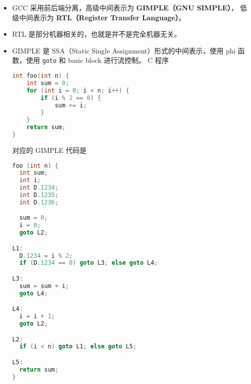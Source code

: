 
\begin{itemize}
\item GCC 采用前后端分离，高级中间表示为 \textbf{GIMPLE（GNU SIMPLE）}， 低级中间表示为 \textbf{RTL（Register Transfer Language）}。
\item RTL 是部分机器相关的，也就是并不是完全机器无关。
\item GIMPLE 是 SSA（Static Single Assignment）形式的中间表示，使用 phi 函数，使用 \verb`goto` 和 basic block 进行流控制。 C 程序
\begin{lstlisting}[language=cpp]
int foo(int n) {
    int sum = 0;
    for (int i = 0; i < n; i++) {
        if (i % 2 == 0) {
            sum += i;
        }
    }
    return sum;
}
\end{lstlisting}
对应的 GIMPLE 代码是
\begin{lstlisting}[language=cpp]
foo (int n) {
  int sum;
  int i;
  int D.1234;
  int D.1235;
  int D.1236;

  sum = 0;
  i = 0;
  goto L2;

L1:
  D.1234 = i % 2;
  if (D.1234 == 0) goto L3; else goto L4;

L3:
  sum = sum + i;
  goto L4;

L4:
  i = i + 1;
  goto L2;

L2:
  if (i < n) goto L1; else goto L5;

L5:
  return sum;
}
\end{lstlisting}
\end{itemize}
